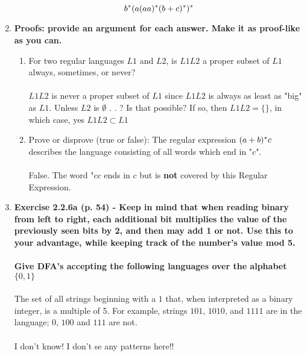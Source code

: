 \begin{enumerate}
$$  b{}^\ast (a(aa){}^\ast (b + c){}^\ast ){}^\ast $$
\newpage
\item \textbf{Proofs: provide an argument for each answer. Make it as
  proof-like as you can.}
\begin{enumerate}
  \item For two regular languages $L1$ and $L2$, is $L1L2$ a proper subset of
    $L1$ always, sometimes, or never?
    \\\\
    $L1L2$ is never a proper subset of $L1$ since $L1L2$ is always as least as "big" as $L1$.   Unless
    $L2$ is $\emptyset$ . . ?  Is that possible?  If so, then $L1L2 = \{\}$, in which case, yes $L1L2 \subset L1$ 
  \item Prove or disprove (true or false): The regular expression $(a+b){}^\ast c$
    describes the language consisting of all words which end in "$c$".
    \\\\
    False.  The word "$cc$ ends in $c$ but is \textbf{not} covered by this Regular Expression.
\end{enumerate}

\newpage
\item \textbf{Exercise 2.2.6a (p. 54) - Keep in mind that when reading binary
  from left to right, each additional bit multiplies the value of the
  previously seen bits by 2, and then may add 1 or not. Use this to your
  advantage, while keeping track of the number's value mod 5.}
\\\\\textbf{Give DFA's accepting the following languages over the alphabet $\{0,1\}$}
\\\\ The set of all strings beginning with a $1$ that, when interpreted as a binary integer, is a 
multiple of 5.  For example, strings $101$, $1010$, and $1111$ are in the language; $0$, $100$
and $111$ are not.
\\\\
I don't know!  I don't se any patterns here!!


\end{enumerate}


